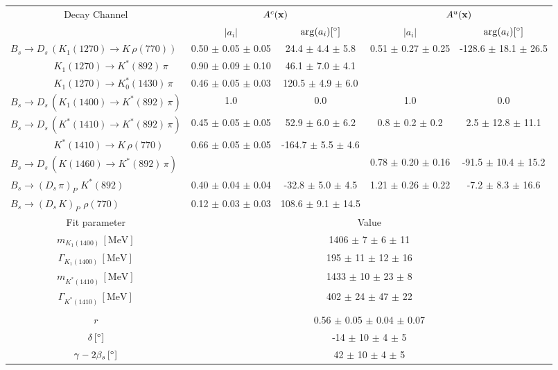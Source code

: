 \begin{tabular}{l c c c c } 
\hline
\hline
\multicolumn{1}{c}{Decay Channel} & \multicolumn{2}{c}{$A^{c}(\mathbf{x})$} & \multicolumn{2}{c}{$A^{u}(\mathbf{x})$}  \\ 
 & \multicolumn{1}{c}{$\vert a_i \vert$}  & \multicolumn{1}{c}{$\arg(a_i) [^{\circ}]$}  & \multicolumn{1}{c}{$\vert a_i \vert$} & \multicolumn{1}{c}{$\arg(a_i) [^{\circ}]$} \\ 
\hline
$B_s \to D_s \, ( K_1(1270) \to K \, \rho(770) ) $ & 0.50 $\pm$ 0.05 $\pm$ 0.05 & 24.4 $\pm$ 4.4 $\pm$ 5.8 & 0.51 $\pm$ 0.27 $\pm$ 0.25 & -128.6 $\pm$ 18.1 $\pm$ 26.5 \\ 
$\phantom{B_s \to D_s \, (} K_1(1270) \to K^{*}(892) \, \pi \phantom{)} $ & 0.90 $\pm$ 0.09 $\pm$ 0.10 & 46.1 $\pm$ 7.0 $\pm$ 4.1 &  &  \\ 
$\phantom{B_s \to D_s \, (} K_1(1270) \to K^{*}_{0}(1430) \, \pi \phantom{)} $ & 0.46 $\pm$ 0.05 $\pm$ 0.03 & 120.5 $\pm$ 4.9 $\pm$ 6.0 &  &  \\ 
 $B_s \to D_s \, ( K_1(1400) \to K^{*}(892) \, \pi ) $ &  1.0 & 0.0 & 1.0 & 0.0  \\ 
$B_s \to D_s \, ( K^{*}(1410) \to K^{*}(892) \, \pi ) $ & 0.45 $\pm$ 0.05 $\pm$ 0.05 & 52.9 $\pm$ 6.0 $\pm$ 6.2 & 0.8 $\pm$ 0.2 $\pm$ 0.2 & 2.5 $\pm$ 12.8 $\pm$ 11.1 \\ 
$\phantom{B_s \to D_s \, (} K^{*}(1410) \to K \, \rho(770) \phantom{)} $ & 0.66 $\pm$ 0.05 $\pm$ 0.05 & -164.7 $\pm$ 5.5 $\pm$ 4.6 & &   \\ 
$B_s \to D_s \, ( K(1460) \to K^{*}(892) \, \pi ) $ & & &0.78 $\pm$ 0.20 $\pm$ 0.16 & -91.5 $\pm$ 10.4 $\pm$ 15.2 \\ 
$B_s \to ( D_s \, \pi)_{P} \, \, K^{*}(892) $ & 0.40 $\pm$ 0.04 $\pm$ 0.04 & -32.8 $\pm$ 5.0 $\pm$ 4.5 & 1.21 $\pm$ 0.26 $\pm$ 0.22 & -7.2 $\pm$ 8.3 $\pm$ 16.6 \\ 
$B_s \to ( D_s \, K)_{P} \, \, \rho(770) $ & 0.12 $\pm$ 0.03 $\pm$ 0.03 & 108.6 $\pm$ 9.1 $\pm$ 14.5 & & \\ 
\hline
\hline
\multicolumn{1}{c}{Fit parameter} & \multicolumn{4}{c}{Value}  \\ 
\hline
\multicolumn{1}{c}{$m_{K_1(1400)} \, [\text{MeV}]$} & \multicolumn{4}{c}{1406 $\pm$ 7 $\pm$ 6 $\pm$ 11} \\ 
\multicolumn{1}{c}{$\Gamma_{K_1(1400)} \, [\text{MeV}]$} & \multicolumn{4}{c}{195 $\pm$ 11 $\pm$ 12 $\pm$ 16} \\ 
\multicolumn{1}{c}{$m_{K^{*}(1410)} \, [\text{MeV}]$} & \multicolumn{4}{c}{1433 $\pm$ 10 $\pm$ 23 $\pm$ 8} \\ 
\multicolumn{1}{c}{$\Gamma_{K^{*}(1410)} \, [\text{MeV}]$} & \multicolumn{4}{c}{402 $\pm$ 24 $\pm$ 47 $\pm$ 22} \\ 
 \\ 
\multicolumn{1}{c}{$r$} & \multicolumn{4}{c}{0.56 $\pm$ 0.05 $\pm$ 0.04 $\pm$ 0.07} \\ 
\multicolumn{1}{c}{$\delta \, [^{\circ}]$} & \multicolumn{4}{c}{-14 $\pm$ 10 $\pm$ 4 $\pm$ 5} \\ 
\multicolumn{1}{c}{$\gamma - 2 \beta_{s} \, [^{\circ}]$} & \multicolumn{4}{c}{42 $\pm$ 10 $\pm$ 4 $\pm$ 5} \\ 
\hline
\hline
\end{tabular}
